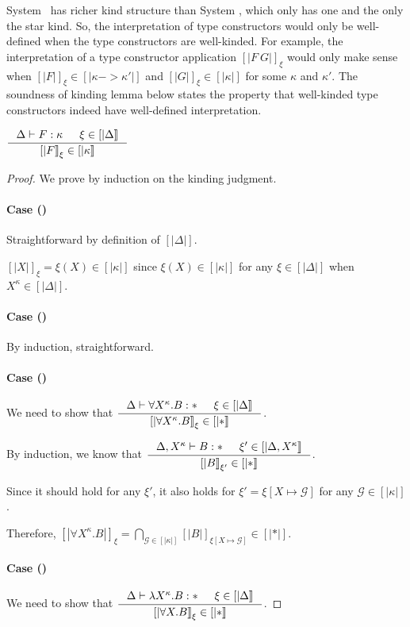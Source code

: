 System \Fw\ has richer kind structure than System \F, which only has one and
the only the star kind. So, the interpretation of type constructors would only
be well-defined when the type constructors are well-kinded. For example,
the interpretation of a type constructor application $[|F~G|]_\xi$
would only make sense when $[|F|]_\xi\in[|\kappa -> \kappa'|]$
and $[|G|]_\xi\in[|\kappa|]$ for some $\kappa$ and $\kappa'$.
The soundness of kinding lemma below states the property that
well-kinded type constructors indeed have well-defined interpretation.
\begin{lemma}  \label{lem:fw:soundki}
$ \inference{\Delta |- F : \kappa & \xi\in[|\Delta|]}{[|F|]_\xi\in[|\kappa|]} $
\end{lemma}
\begin{proof}
We prove by induction on the kinding judgment.
\paragraph{Case ()}
Straightforward by definition of $[|\Delta|]$.

$[|X|]_\xi=\xi(X) \in [|\kappa|]$
since $\xi(X)\in[|\kappa|]$ for any $\xi\in[|\Delta|]$
when $X^\kappa \in [|\Delta|]$.

\paragraph{Case ()} By induction, straightforward.

\paragraph{Case ()}
We need to show that
$ \inference{\Delta |- \forall X^\kappa.B:* & \xi\in[|\Delta|]}
	{[|\forall X^\kappa.B|]_\xi\in[|*|]} $.

By induction, we know that
$ \inference{\Delta,X^\kappa |- B:* & \xi'\in[|\Delta,X^\kappa|]}
	{[|B|]_{\xi'} \in [|*|]} $.

Since it should hold for any $\xi'$, it also holds for
$\xi'=\xi[X\mapsto\mathcal{G}]$ for any $\mathcal{G}\in[|\kappa|]$.

Therefore,
$  [|\forall X^\kappa.B|]_\xi
 = \bigcap_{\mathcal{G}\in[|\kappa|]}[|B|]_{\xi[X\mapsto\mathcal{G}]}\in[|*|] $.

\paragraph{Case ()}
We need to show that
$ \inference{\Delta |- \l X^\kappa.B:* & \xi\in[|\Delta|]}
	{[|\forall X.B|]_\xi\in[|*|]} $.


\end{proof}
